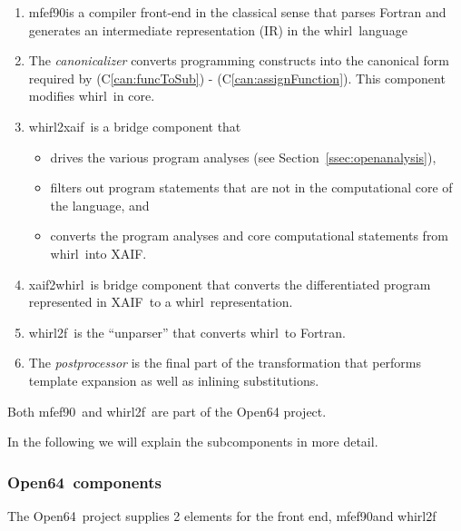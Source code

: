 \documentclass[acmtocl,acmnow]{acmtrans2m}
\newcommand{\mfefninety}{mfef90}
\newcommand{\OpenSixtyFour}{Open64}
\newcommand{\xaif}{XAIF}
\newcommand{\whirl}{whirl}
\newcommand{\whirlToxaif}{whirl2xaif}
\newcommand{\whirlTof}{whirl2f}
\newcommand{\xaifTowhirl}{xaif2whirl}
\newcommand{\refsec}[1]{Section~\ref{#1}}
\newcommand{\refcan}[1]{(C\ref{#1})}
\begin{document}
   \begin{enumerate}	
     \item \mfefninety is a compiler front-end in the classical sense that parses
       Fortran and generates an intermediate representation (IR)
       in the \whirl\ language

     \item The {\em canonicalizer} converts  
        programming constructs into the canonical form required by 
	\refcan{can:funcToSub} - \refcan{can:assignFunction}. 
	This component modifies \whirl\ in core.

     \item \whirlToxaif\ is a bridge component that
        \begin{itemize}
           \item drives the various program analyses (see \refsec{ssec:openanalysis}),
        
           \item filters out program statements that are not in the
                 computational core of the language, and 

           \item converts the program analyses and core computational
                 statements from \whirl\ into \xaif.
        \end{itemize}

     \item \xaifTowhirl\ is bridge component that converts the 
        differentiated program represented in \xaif\ 
        to a \whirl\ representation.

     \item \whirlTof\ is the ``unparser'' that converts \whirl\ to
        Fortran.

     \item The {\em postprocessor} is the  final part of the transformation that
        performs template expansion as well as inlining substitutions.

   \end{enumerate}

Both \mfefninety\ and \whirlTof\ are part of the Open64 project.

In the following we will explain the 
subcomponents in more detail. 

\subsubsection{\OpenSixtyFour\ components} \label{sssec:mfef}
The \OpenSixtyFour\ project supplies 2 elements for the front end, 
\mfefninety and \whirlTof
\end{document}
